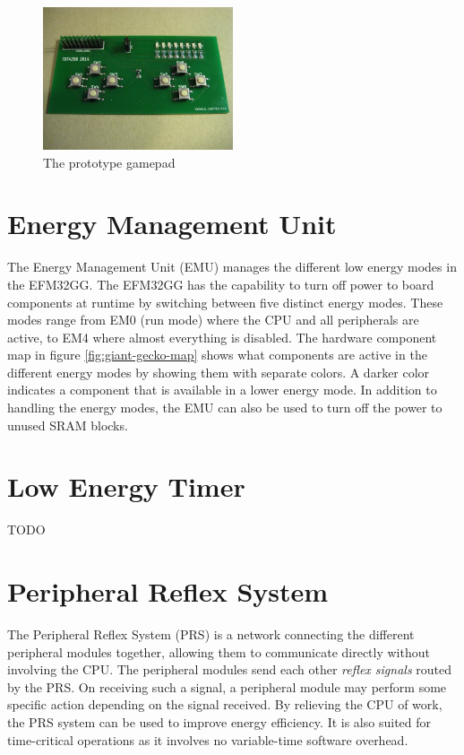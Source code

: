 \begin{figure}[ht]
  \centering
  \includegraphics[width=0.5\textwidth]{images/gamepad.jpg}
  \caption{The prototype gamepad}\label{fig:gamepad}
\end{figure}


\section{Energy Management Unit}\label{sec:emu}
The Energy Management Unit (EMU) manages the different low energy modes in the EFM32GG. The EFM32GG has the capability to turn off power to board components at runtime by switching between five distinct energy modes. These modes range from EM0 (run mode) where the CPU and all peripherals are active, to EM4 where almost everything is disabled. The hardware component map in figure \ref{fig:giant-gecko-map} shows what components are active in the different energy modes by showing them with separate colors. A darker color indicates a component that is available in a lower energy mode. In addition to handling the energy modes, the EMU can also be used to turn off the power to unused SRAM blocks.\cite{efm32gg-rm}


\section{Low Energy Timer}\label{sec:letimer}
TODO %


\section{Peripheral Reflex System}
The Peripheral Reflex System (PRS) is a network connecting the different peripheral modules together, allowing them to communicate directly without involving the CPU. The peripheral modules send each other \emph{reflex signals} routed by the PRS. On receiving such a signal, a peripheral module may perform some specific action depending on the signal received. By relieving the CPU of work, the PRS system can be used to improve energy efficiency. It is also suited for time-critical operations as it involves no variable-time software overhead.


